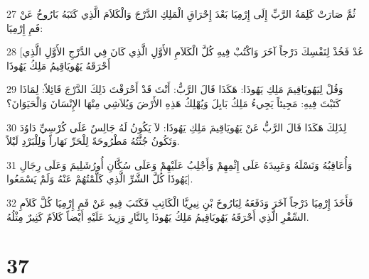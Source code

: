 \par 27 ثُمَّ صَارَتْ كَلِمَةُ الرَّبِّ إِلَى إِرْمِيَا بَعْدَ إِحْرَاقِ الْمَلِكِ الدَّرْجَ وَالْكَلاَمَ الَّذِي كَتَبَهُ بَارُوخُ عَنْ فَمِ إِرْمِيَا:
\par 28 [عُدْ فَخُذْ لِنَفْسِكَ دَرْجاً آخَرَ وَاكْتُبْ فِيهِ كُلَّ الْكَلاَمِ الأَوَّلِ الَّذِي كَانَ فِي الدَّرْجِ الأَوَّلِ الَّذِي أَحْرَقَهُ يَهُويَاقِيمُ مَلِكُ يَهُوذَا
\par 29 وَقُلْ لِيَهُويَاقِيمَ مَلِكِ يَهُوذَا: هَكَذَا قَالَ الرَّبُّ: أَنْتَ قَدْ أَحْرَقْتَ ذَلِكَ الدَّرْجَ قَائِلاً: لِمَاذَا كَتَبْتَ فِيهِ: مَجِيئاً يَجِيءُ مَلِكُ بَابِلَ وَيُهْلِكُ هَذِهِ الأَرْضَ وَيُلاَشِي مِنْهَا الإِنْسَانَ وَالْحَيَوَانَ؟
\par 30 لِذَلِكَ هَكَذَا قَالَ الرَّبُّ عَنْ يَهُويَاقِيمَ مَلِكِ يَهُوذَا: لاَ يَكُونُ لَهُ جَالِسٌ عَلَى كُرْسِيِّ دَاوُدَ وَتَكُونُ جُثَّتُهُ مَطْرُوحَةً لِلْحَرِّ نَهَاراً وَلِلْبَرْدِ لَيْلاً.
\par 31 وَأُعَاقِبُهُ وَنَسْلَهُ وَعَبِيدَهُ عَلَى إِثْمِهِمْ وَأَجْلِبُ عَلَيْهِمْ وَعَلَى سُكَّانِ أُورُشَلِيمَ وَعَلَى رِجَالِ يَهُوذَا كُلَّ الشَّرِّ الَّذِي كَلَّمْتُهُمْ عَنْهُ وَلَمْ يَسْمَعُوا].
\par 32 فَأَخَذَ إِرْمِيَا دَرْجاً آخَرَ وَدَفَعَهُ لِبَارُوخَ بْنِ نِيرِيَّا الْكَاتِبِ فَكَتَبَ فِيهِ عَنْ فَمِ إِرْمِيَا كُلَّ كَلاَمِ السِّفْرِ الَّذِي أَحْرَقَهُ يَهُويَاقِيمُ مَلِكُ يَهُوذَا بِالنَّارِ وَزِيدَ عَلَيْهِ أَيْضاً كَلاَمٌ كَثِيرٌ مِثْلُهُ.

\chapter{37}

